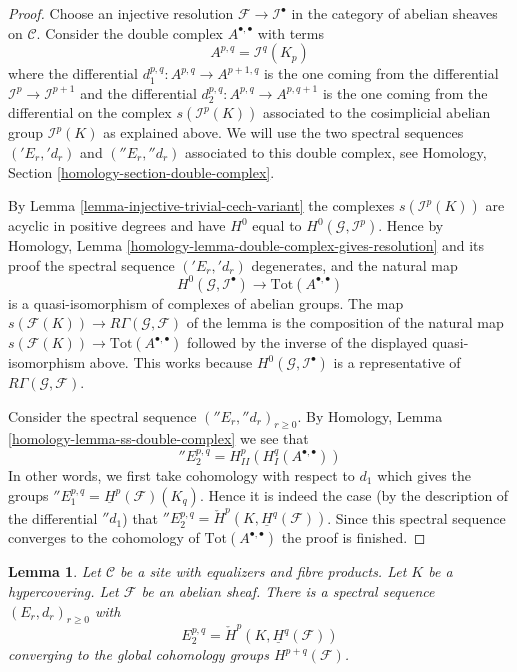\documentclass{stacks-project}
\theoremstyle{plain}
\newtheorem{lemma}[subsection]{Lemma}
\theoremstyle{definition}
\theoremstyle{remark}
\numberwithin{equation}{subsection}
\begin{document}
\begin{proof}
Choose an injective resolution $\mathcal{F} \to \mathcal{I}^\bullet$
in the category of abelian sheaves on $\mathcal{C}$. Consider the
double complex $A^{\bullet, \bullet}$ with terms
$$
A^{p, q} = \mathcal{I}^q(K_p)
$$
where the differential $d_1^{p, q} : A^{p, q} \to A^{p + 1, q}$
is the one coming from the differential $\mathcal{I}^p \to \mathcal{I}^{p + 1}$
and the differential $d_2^{p, q} : A^{p, q} \to A^{p, q + 1}$ is the
one coming from the differential on the complex
$s(\mathcal{I}^p(K))$ associated to the cosimplicial abelian group
$\mathcal{I}^p(K)$ as explained above.
We will use the two spectral
sequences $({}'E_r, {}'d_r)$ and $({}''E_r, {}''d_r)$
associated to this double complex, see
Homology, Section \ref{homology-section-double-complex}.

\medskip\noindent
By Lemma \ref{lemma-injective-trivial-cech-variant} the complexes
$s(\mathcal{I}^p(K))$ are acyclic in positive degrees and have
$H^0$ equal to $H^0(\mathcal{G}, \mathcal{I}^p)$. Hence by
Homology, Lemma \ref{homology-lemma-double-complex-gives-resolution}
and its proof the spectral sequence $({}'E_r, {}'d_r)$ degenerates,
and the natural map
$$
H^0(\mathcal{G}, \mathcal{I}^\bullet) \longrightarrow
\text{Tot}(A^{\bullet, \bullet})
$$
is a quasi-isomorphism of complexes of abelian groups. The map
$s(\mathcal{F}(K)) \longrightarrow R\Gamma(\mathcal{G}, \mathcal{F})$
of the lemma is the composition of the natural map
$s(\mathcal{F}(K)) \to \text{Tot}(A^{\bullet, \bullet})$
followed by the inverse of the displayed quasi-isomorphism above.
This works because $H^0(\mathcal{G}, \mathcal{I}^\bullet)$
is a representative of $R\Gamma(\mathcal{G}, \mathcal{F})$.

\medskip\noindent
Consider the spectral sequence $({}''E_r, {}''d_r)_{r \geq 0}$. By
Homology, Lemma \ref{homology-lemma-ss-double-complex}
we see that
$$
{}''E_2^{p, q} = H^p_{II}(H^q_I(A^{\bullet, \bullet}))
$$
In other words, we first take cohomology with respect to
$d_1$ which gives the groups
${}''E_1^{p, q} = \underline{H}^p(\mathcal{F})(K_q)$.
Hence it is indeed the case (by the description of the differential
${}''d_1$) that
${}''E_2^{p, q} = \check{H}^p(K, \underline{H}^q(\mathcal{F}))$.
Since this spectral sequence converges to the cohomology of
$\text{Tot}(A^{\bullet, \bullet})$ the proof is finished.
\end{proof}

\begin{lemma}
\label{lemma-cech-spectral-sequence-verdier}
Let $\mathcal{C}$ be a site with equalizers and fibre products.
Let $K$ be a hypercovering.
Let $\mathcal{F}$ be an abelian sheaf. There is a
spectral sequence $(E_r, d_r)_{r \geq 0}$ with
$$
E_2^{p, q} = \check{H}^p(K, \underline{H}^q(\mathcal{F}))
$$
converging to the global cohomology groups $H^{p + q}(\mathcal{F})$.
\end{lemma}
\end{document}
